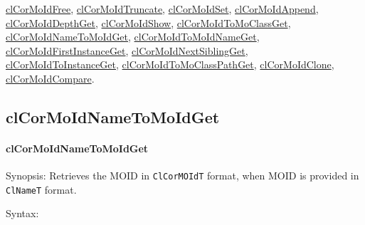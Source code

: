\begin{flushleft}
\begin{Desc}
\hyperlink{pagecor114}{cl\-Cor\-MoId\-Free},
\hyperlink{pagecor115}{cl\-Cor\-MoId\-Truncate}, 
\hyperlink{pagecor116}{cl\-Cor\-MoId\-Set}, 
\hyperlink{pagecor117}{cl\-Cor\-MoId\-Append}, 
\hyperlink{pagecor118}{cl\-Cor\-MoId\-Depth\-Get}, 
\hyperlink{pagecor119}{cl\-Cor\-MoId\-Show}, 
\hyperlink{pagecor120}{cl\-Cor\-MoId\-To\-Mo\-Class\-Get}, 
\hyperlink{pagecor121}{cl\-Cor\-MoId\-Name\-To\-MoId\-Get}, 
\hyperlink{pagecor122}{cl\-Cor\-MoId\-To\-MoId\-Name\-Get}, 
\hyperlink{pagecor123}{cl\-Cor\-MoId\-First\-Instance\-Get},
\hyperlink{pagecor124}{cl\-Cor\-MoId\-Next\-Sibling\-Get}, 
\hyperlink{pagecor125}{cl\-Cor\-MoId\-To\-Instance\-Get}, 
\hyperlink{pagecor126}{cl\-Cor\-MoId\-To\-Mo\-Class\-Path\-Get}, 
\hyperlink{pagecor127}{cl\-Cor\-MoId\-Clone}, 
\hyperlink{pagecor128}{cl\-Cor\-MoId\-Compare}.\end{Desc}
\newpage


\subsection{clCorMoIdNameToMoIdGet}
\hypertarget{pagecor121}{}\paragraph{cl\-Cor\-MoId\-Name\-To\-MoId\-Get}\label{pagecor121}
\begin{Desc}
\item[Synopsis:]Retrieves the MOID in {\tt{ClCorMOIdT}} format, when MOID is provided in {\tt{ClNameT}} format.\end{Desc}
\begin{Desc}
\item[Syntax:]


\end{Desc}
\end{flushleft}
